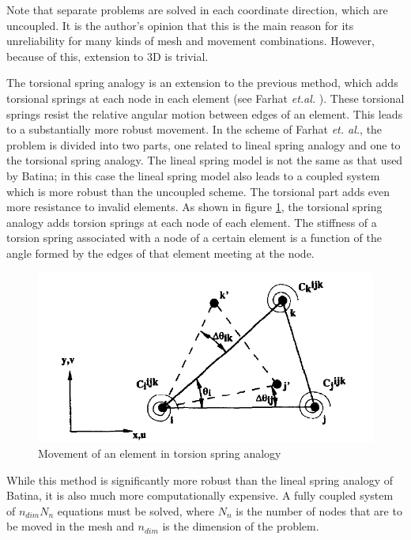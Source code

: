\documentclass[letterpaper,11pt]{article}
\begin{document}
Note that separate problems are solved in each coordinate direction, which are uncoupled. It is the author's opinion that this is the main reason for its unreliability for many kinds of mesh and movement combinations. However, because of this, extension to 3D is trivial.

The torsional spring analogy is an extension to the previous method, which adds torsional springs at each node in each element (see Farhat \emph{et.al.} \cite{mm:torsionsprings}).
These torsional springs resist the relative angular motion between edges of an element. This leads to a substantially more robust movement. In the scheme of Farhat \emph{et. al.}, the problem is divided into two parts, one related to lineal spring analogy and one to the torsional spring analogy. The lineal spring model is not the same as that used by Batina; in this case the lineal spring model also leads to a coupled system which is more robust than the uncoupled scheme. The torsional part adds even more resistance to invalid elements. As shown in figure \ref{f:torsion}, the torsional spring analogy adds torsion springs at each node of each element. The stiffness of a torsion spring associated with a node of a certain element is a function of the angle formed by the edges of that element meeting at the node.

\begin{figure}
\centering
\includegraphics[scale=0.25]{torsionspring}
\caption{Movement of an element in torsion spring analogy}
\label{f:torsion}
\end{figure}

While this method is significantly more robust than the lineal spring analogy of Batina, it is also much more computationally expensive. A fully coupled system of $n_{dim} N_n$ equations must be solved, where $N_n$ is the number of nodes that are to be moved in the mesh and $n_{dim}$ is the dimension of the problem.
\end{document}
